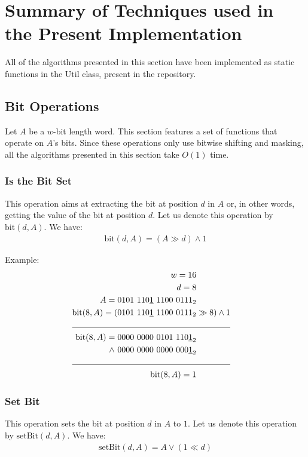 \newpage
\section{Summary of Techniques used in the Present Implementation} \label{sec:summaryOfTechniques}

All of the algorithms presented in this section have been implemented as static functions in the {\ttfamily Util} class, present in the repository.

\subsection{Bit Operations} \label{sec:bit}

Let $A$ be a $w$-bit length word. This section features a set of functions that operate on $A$'s bits. Since these operations only use bitwise shifting and masking, all the algorithms presented in this section take $O(1)$ time.

\subsubsection{Is the Bit Set}

This operation aims at extracting the bit at position $d$ in $A$ or, in other words, getting the value of the bit at position $d$. Let us denote this operation by $\text{bit}(d, A)$. We have:
\begin{align*}
    \text{bit}(d, A) = (A \gg d) \wedge 1
\end{align*}

Example:
\begin{align*}
    w = 16\\
    d = 8\\
    A = 0101\ 110\underline{1}\ 1100\ 0111_2& \\
    \text{bit}(8,A) = (0101\ 110\underline{1}\ 1100\ 0111_2& \gg 8) \wedge 1 \\
    \cline{1-2}
    \text{bit}(8,A) = 0000\ 0000\ 0101\ 110\underline{1}_2& \\
    \wedge\ 0000\ 0000\ 0000\ 000\underline{1}_2 \\
    \cline{1-2}
    \text{bit}(8,A) = 1 &
\end{align*}

\subsubsection{Set Bit}
This operation sets the bit at position $d$ in $A$ to $1$. Let us denote this operation by $\text{setBit}(d, A)$. We have:
\begin{align*}
    \text{setBit}(d, A) = A \vee (1 \ll d)
\end{align*}

